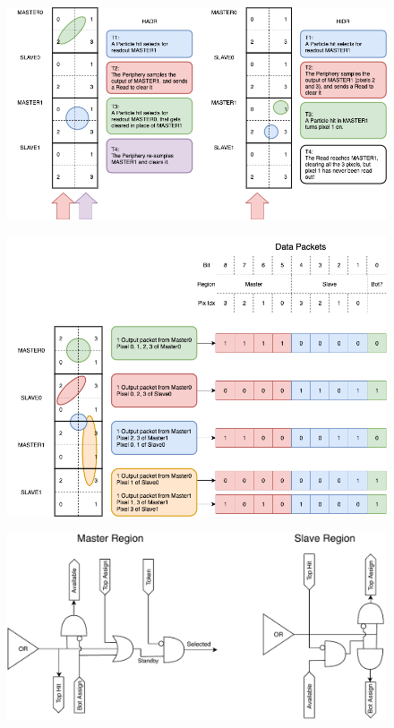         \begin{figure}[h!]
            \centering
            \includegraphics[width=.95\linewidth]{figures/ARCADIA/hadrhidr.png}
            \caption{}
            \label{fig:hadrhidr}
        \end{figure}
        


        \begin{figure}[h!]
            \centering
            \includegraphics[width=.95\linewidth]{figures/ARCADIA/clustering.png}
            \caption{}
            \label{fig:clustering}
        \end{figure}

        \begin{figure}[h!]
            \centering
            \includegraphics[width=.95\linewidth]{figures/ARCADIA/clustering_logic.pdf}
            \caption{}
            \label{fig:clustering_logic}
        \end{figure}
        


